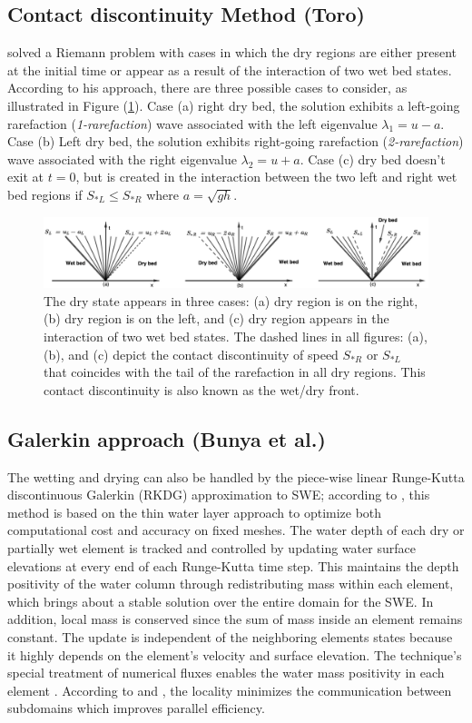 \documentclass[9pt,a4paper]{article}
\newcommand{\Fig}[1]{Figure (\ref{fig:#1})}
\begin{document}
	\subsection{Contact discontinuity  Method (Toro)}
	\citet{toro2001shock} solved a Riemann problem with cases in which the dry regions are either present at the initial time or appear as a result of the interaction of two wet bed states. According to his approach, there are three possible cases to consider, as illustrated in \Fig{dry-wet}. Case (a) right dry bed, the solution exhibits a left-going rarefaction ({\em 1-rarefaction}) wave associated with the left eigenvalue $\lambda_1 = u - a$. Case (b) Left dry bed, the solution exhibits right-going rarefaction ({\em 2-rarefaction}) wave associated with the right eigenvalue $\lambda_2 = u + a$. Case (c) dry bed doesn't exit at $t=0$, but is created in the interaction between the two left and right wet bed regions if $S_{*L} \le S_{*R}$ where $a = \sqrt{gh}$.
	\begin{figure}[H]
		\centering
		\includegraphics[width=.9\linewidth]{images/dry-wet}
		\caption{The dry state appears in three cases: (a) dry region is on the right, (b) dry region is on the left, and (c) dry region appears in the interaction of two wet bed states. The dashed lines in all figures: (a), (b), and (c) depict the contact discontinuity of speed $S_{*R}$ or $S_{*L}$ that coincides with the tail of the rarefaction in all dry regions. This contact discontinuity is also known as the wet/dry front.}
		\label{fig:dry-wet}
	\end{figure}
	
	
	
	\subsection{Galerkin approach (Bunya et al.)}  
	The wetting and drying can also be handled by the piece-wise linear Runge-Kutta discontinuous Galerkin (RKDG)  approximation  to SWE;  according to   \citet{bu-ku-we-da:2009}, this method is based on the thin water layer approach to optimize both computational cost and accuracy on fixed meshes. The water depth of each dry or partially wet element is tracked and controlled by updating water surface elevations at every end of each Runge-Kutta time step. This maintains the depth positivity of the water column through redistributing mass within each element, which brings about a stable solution over the entire domain for the SWE. In addition, local mass is conserved since the sum of mass inside an element remains constant. The update is independent of the neighboring elements states because it highly depends on the element's velocity and surface elevation. The technique's special treatment of numerical fluxes enables the water mass positivity in each element  \citep{bu-ku-we-da:2009,kubatko2007semi}. According to   \citet{bokhove2005flooding} and \citet{bu-ku-we-da:2009}, the locality minimizes the communication between subdomains which improves parallel efficiency. 
	
\end{document}
